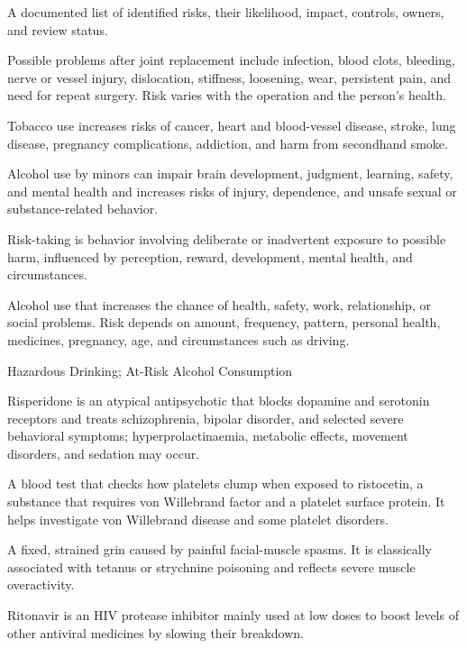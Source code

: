  A documented list of identified risks, their likelihood, impact, controls, owners, and review status.

 Possible problems after joint replacement include infection, blood clots, bleeding, nerve or vessel injury, dislocation, stiffness, loosening, wear, persistent pain, and need for repeat surgery. Risk varies with the operation and the person's health.

 Tobacco use increases risks of cancer, heart and blood-vessel disease, stroke, lung disease, pregnancy complications, addiction, and harm from secondhand smoke.

 Alcohol use by minors can impair brain development, judgment, learning, safety, and mental health and increases risks of injury, dependence, and unsafe sexual or substance-related behavior.

 Risk-taking is behavior involving deliberate or inadvertent exposure to possible harm, influenced by perception, reward, development, mental health, and circumstances.

 Alcohol use that increases the chance of health, safety, work, relationship, or social problems. Risk depends on amount, frequency, pattern, personal health, medicines, pregnancy, age, and circumstances such as driving.

\synonyms
Hazardous Drinking; At-Risk Alcohol Consumption

 Risperidone is an atypical antipsychotic that blocks dopamine and serotonin receptors and treats schizophrenia, bipolar disorder, and selected severe behavioral symptoms; hyperprolactinaemia, metabolic effects, movement disorders, and sedation may occur.

 A blood test that checks how platelets clump when exposed to ristocetin, a substance that requires von Willebrand factor and a platelet surface protein. It helps investigate von Willebrand disease and some platelet disorders.

 A fixed, strained grin caused by painful facial-muscle spasms. It is classically associated with tetanus or strychnine poisoning and reflects severe muscle overactivity.

 Ritonavir is an HIV protease inhibitor mainly used at low doses to boost levels of other antiviral medicines by slowing their breakdown.

